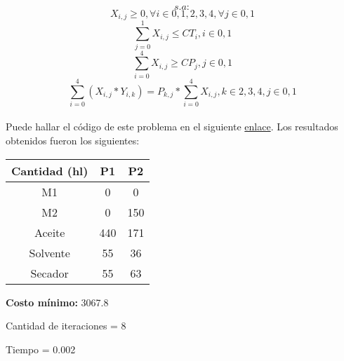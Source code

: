 \documentclass[titlepage, 11pt]{scrartcl}
\begin{document}
{\begin{description}
    		$$s.a:$$
    		$$X_{i, j} \geq 0, \forall i \in 0, 1, 2, 3, 4, \forall j \in 0, 1$$
    		$$\sum_{j=0}^{1}X_{i, j} \leq CT_i, i \in 0, 1$$
    		$$\sum_{i=0}^{4}X_{i, j} \geq CP_j, j \in 0, 1$$
    		$$\sum_{i=0}^{4}(X_{i, j} * Y_{i, k}) = P_{k, j} * \sum_{i=0}^{4}X_{i, j}, k \in 2, 3, 4, j \in 0, 1$$\\
    		
    		
    		Puede hallar el c\'odigo de este problema en el siguiente \href{lab1ex1.py}{enlace}. Los resultados obtenidos fueron los siguientes:
    		
    		\begin{center}
    			\begin{tabular}{| c | c | c |}
    				\hline
    				Cantidad (hl) & P1 & P2\\\hline
    				M1 & 0 & 0 \\
    				M2 & 0 & 150\\
    				Aceite & 440 & 171\\
    				Solvente & 55 & 36\\    				
    				Secador & 55 & 63 \\ \hline
    			\end{tabular}	
    		\end{center}
    		
    		\textbf{Costo m\'inimo: } 3067.8
    		
    		Cantidad de iteraciones = 8
    		
    		Tiempo = 0.002
    	\end{description}

	}
\end{document}
